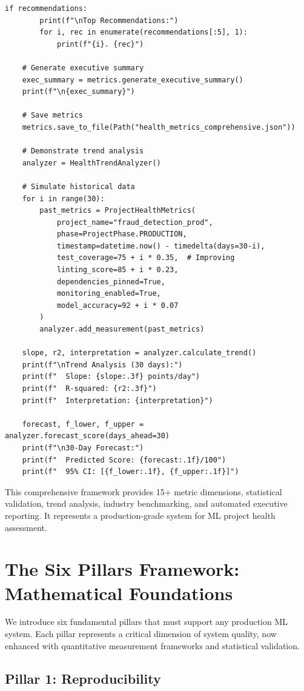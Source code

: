 \begin{lstlisting}[style=python, caption={Comprehensive project health metrics framework with 15+ dimensions}]
    if recommendations:
        print(f"\nTop Recommendations:")
        for i, rec in enumerate(recommendations[:5], 1):
            print(f"{i}. {rec}")

    # Generate executive summary
    exec_summary = metrics.generate_executive_summary()
    print(f"\n{exec_summary}")

    # Save metrics
    metrics.save_to_file(Path("health_metrics_comprehensive.json"))

    # Demonstrate trend analysis
    analyzer = HealthTrendAnalyzer()

    # Simulate historical data
    for i in range(30):
        past_metrics = ProjectHealthMetrics(
            project_name="fraud_detection_prod",
            phase=ProjectPhase.PRODUCTION,
            timestamp=datetime.now() - timedelta(days=30-i),
            test_coverage=75 + i * 0.35,  # Improving
            linting_score=85 + i * 0.23,
            dependencies_pinned=True,
            monitoring_enabled=True,
            model_accuracy=92 + i * 0.07
        )
        analyzer.add_measurement(past_metrics)

    slope, r2, interpretation = analyzer.calculate_trend()
    print(f"\nTrend Analysis (30 days):")
    print(f"  Slope: {slope:.3f} points/day")
    print(f"  R-squared: {r2:.3f}")
    print(f"  Interpretation: {interpretation}")

    forecast, f_lower, f_upper = analyzer.forecast_score(days_ahead=30)
    print(f"\n30-Day Forecast:")
    print(f"  Predicted Score: {forecast:.1f}/100")
    print(f"  95% CI: [{f_lower:.1f}, {f_upper:.1f}]")
\end{lstlisting}

This comprehensive framework provides 15+ metric dimensions, statistical validation, trend analysis, industry benchmarking, and automated executive reporting. It represents a production-grade system for ML project health assessment.

\section{The Six Pillars Framework: Mathematical Foundations}

We introduce six fundamental pillars that must support any production ML system. Each pillar represents a critical dimension of system quality, now enhanced with quantitative measurement frameworks and statistical validation.

\subsection{Pillar 1: Reproducibility}

